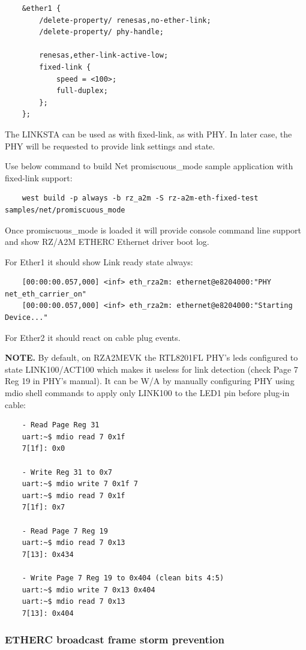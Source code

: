 \documentclass[11pt,a4paper,oneside]{article}
\begin{document}
\begin{lstlisting}
	&ether1 {
		/delete-property/ renesas,no-ether-link;
		/delete-property/ phy-handle;

		renesas,ether-link-active-low;
		fixed-link {
			speed = <100>;
			full-duplex;
		};
	};
\end{lstlisting}

The LINKSTA can be used as with fixed-link, as with PHY. In later case, the PHY will be requested to provide link settings and state.

Use below command to build Net promiscuous\_mode sample application with fixed-link support:

\begin{lstlisting}
	west build -p always -b rz_a2m -S rz-a2m-eth-fixed-test samples/net/promiscuous_mode
\end{lstlisting}

Once promiscuous\_mode is loaded it will provide console command line support and show  RZ/A2M ETHERC Ethernet driver boot log.

For Ether1 it should show Link ready state always:
\begin{lstlisting}
	[00:00:00.057,000] <inf> eth_rza2m: ethernet@e8204000:"PHY net_eth_carrier_on"
	[00:00:00.057,000] <inf> eth_rza2m: ethernet@e8204000:"Starting Device..."
\end{lstlisting}

For Ether2 it should react on cable plug events.

\textbf{NOTE.}
By default, on RZA2MEVK the RTL8201FL PHY's leds configured to state LINK100/ACT100 which makes it useless for link detection (check Page 7 Reg 19 in PHY's manual).
It can be W/A by manually configuring PHY using mdio shell commands to apply only LINK100 to the LED1 pin before plug-in cable:

\begin{lstlisting}
	- Read Page Reg 31
	uart:~$ mdio read 7 0x1f
	7[1f]: 0x0

	- Write Reg 31 to 0x7
	uart:~$ mdio write 7 0x1f 7
	uart:~$ mdio read 7 0x1f
	7[1f]: 0x7

	- Read Page 7 Reg 19
	uart:~$ mdio read 7 0x13
	7[13]: 0x434

	- Write Page 7 Reg 19 to 0x404 (clean bits 4:5)
	uart:~$ mdio write 7 0x13 0x404
	uart:~$ mdio read 7 0x13
	7[13]: 0x404
\end{lstlisting}

\subsubsection{ETHERC broadcast frame storm prevention}\label{eth-bc-filter-support}
\end{document}

